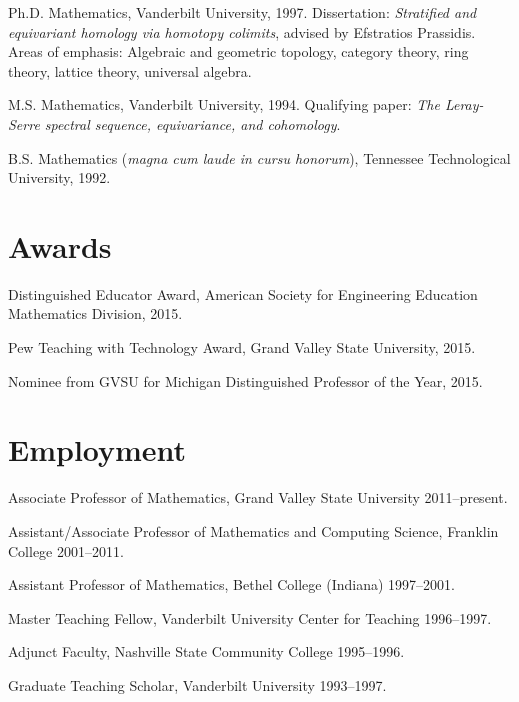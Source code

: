 \documentclass[letterpaper]{article}
\renewenvironment{itemize}{
  \begin{list}{}{
    \setlength{\leftmargin}{1.5em}
	\setlength{\itemsep}{0in}
  }
}{
  \end{list}
}
\begin{document}
\begin{itemize}
  \item Ph.D. Mathematics, Vanderbilt University, 1997. Dissertation: \emph{Stratified and equivariant homology via homotopy colimits}, advised by Efstratios Prassidis. Areas of emphasis: Algebraic and geometric topology, category theory, ring theory, lattice theory, universal algebra.


  \item M.S. Mathematics, Vanderbilt University, 1994. Qualifying paper: \emph{The Leray-Serre spectral sequence, equivariance, and cohomology}. 

  \item B.S. Mathematics (\emph{magna cum laude in cursu honorum}), Tennessee Technological University, 1992. 

\end{itemize}

\section*{Awards}
\begin{itemize}
	\item Distinguished Educator Award, American Society for Engineering Education Mathematics Division, 2015. 
	\item Pew Teaching with Technology Award, Grand Valley State University, 2015. 
	\item Nominee from GVSU for Michigan Distinguished Professor of the Year, 2015. 
\end{itemize}


\section*{Employment}

\begin{itemize}
\item Associate Professor of Mathematics, Grand Valley State University 2011--present. 	
\item Assistant/Associate Professor of Mathematics and Computing Science, Franklin College 2001--2011. 
\item Assistant Professor of Mathematics, Bethel College (Indiana) 1997--2001. 
\item Master Teaching Fellow, Vanderbilt University Center for Teaching 1996--1997. 
\item Adjunct Faculty, Nashville State Community College 1995--1996. 
\item Graduate Teaching Scholar, Vanderbilt University 1993--1997. 
\end{itemize}
\end{document}
